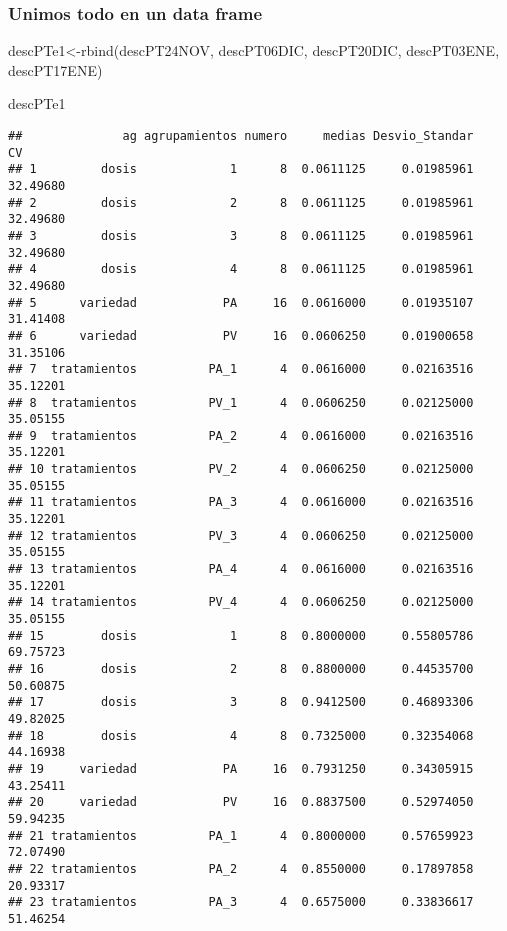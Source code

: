 \documentclass[
]{article}
\newenvironment{Shaded}{\begin{snugshade}}{\end{snugshade}}
\newcommand{\FunctionTok}[1]{\textcolor[rgb]{0.00,0.00,0.00}{#1}}
\newcommand{\NormalTok}[1]{#1}
\newcommand{\OtherTok}[1]{\textcolor[rgb]{0.56,0.35,0.01}{#1}}
\begin{document}
\hypertarget{unimos-todo-en-un-data-frame}{%
\subsubsection{Unimos todo en un data
frame}\label{unimos-todo-en-un-data-frame}}

\begin{Shaded}
\begin{Highlighting}[]
\NormalTok{descPTe1}\OtherTok{\textless{}{-}}\FunctionTok{rbind}\NormalTok{(descPT24NOV, descPT06DIC, descPT20DIC, descPT03ENE, descPT17ENE)}

\NormalTok{descPTe1}
\end{Highlighting}
\end{Shaded}

\begin{verbatim}
##              ag agrupamientos numero     medias Desvio_Standar       CV
## 1         dosis             1      8  0.0611125     0.01985961 32.49680
## 2         dosis             2      8  0.0611125     0.01985961 32.49680
## 3         dosis             3      8  0.0611125     0.01985961 32.49680
## 4         dosis             4      8  0.0611125     0.01985961 32.49680
## 5      variedad            PA     16  0.0616000     0.01935107 31.41408
## 6      variedad            PV     16  0.0606250     0.01900658 31.35106
## 7  tratamientos          PA_1      4  0.0616000     0.02163516 35.12201
## 8  tratamientos          PV_1      4  0.0606250     0.02125000 35.05155
## 9  tratamientos          PA_2      4  0.0616000     0.02163516 35.12201
## 10 tratamientos          PV_2      4  0.0606250     0.02125000 35.05155
## 11 tratamientos          PA_3      4  0.0616000     0.02163516 35.12201
## 12 tratamientos          PV_3      4  0.0606250     0.02125000 35.05155
## 13 tratamientos          PA_4      4  0.0616000     0.02163516 35.12201
## 14 tratamientos          PV_4      4  0.0606250     0.02125000 35.05155
## 15        dosis             1      8  0.8000000     0.55805786 69.75723
## 16        dosis             2      8  0.8800000     0.44535700 50.60875
## 17        dosis             3      8  0.9412500     0.46893306 49.82025
## 18        dosis             4      8  0.7325000     0.32354068 44.16938
## 19     variedad            PA     16  0.7931250     0.34305915 43.25411
## 20     variedad            PV     16  0.8837500     0.52974050 59.94235
## 21 tratamientos          PA_1      4  0.8000000     0.57659923 72.07490
## 22 tratamientos          PA_2      4  0.8550000     0.17897858 20.93317
## 23 tratamientos          PA_3      4  0.6575000     0.33836617 51.46254

\end{verbatim}
\end{document}
